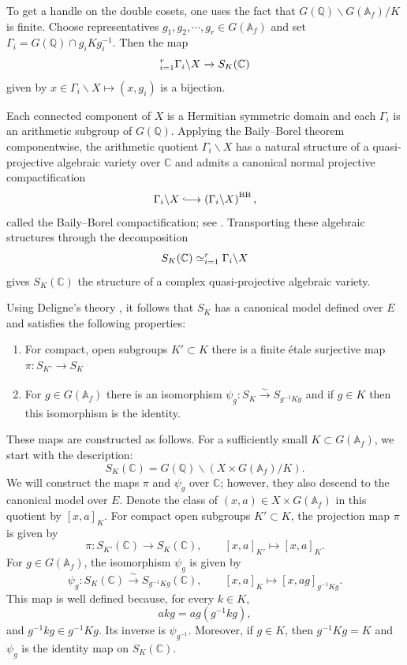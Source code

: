\documentclass[11pt,a4paper]{article}
\let\coprod\relax
\theoremstyle{definition}
\theoremstyle{plain}
\theoremstyle{remark}
\theoremstyle{plain}
\begin{document}
To get a handle on the double cosets, one uses the fact that $G(\mathbb{Q}) \backslash G(\mathbb{A}_f) / K$ is finite. Choose representatives $g_1, g_2, \cdots, g_r \in G(\mathbb{A}_f)$ and set $\Gamma_i = G(\mathbb{Q}) \cap g_i K g_i^{-1}$. Then the map $$ \coprod_{i=1}^r \Gamma_i \backslash X \xrightarrow{} S_K(\mathbb{C})$$ given by $x \in \Gamma_i \backslash X \mapsto (x, g_i)$ is a bijection. 

Each connected component of $X$ is a Hermitian symmetric domain and each $\Gamma_i$ is
an arithmetic subgroup of $G(\mathbb{Q})$. Applying the Baily--Borel theorem componentwise, the
arithmetic quotient $\Gamma_i\backslash X$ has a natural structure of a
quasi-projective algebraic variety over $\mathbb{C}$ and admits a canonical
normal projective compactification
$$
    \Gamma_i\backslash X
    \lhook\joinrel\longrightarrow
    \left(\Gamma_i\backslash X\right)^{\mathrm{BB}},
$$
called the Baily--Borel compactification; see \cite{MR216035}. Transporting
these algebraic structures through the decomposition
$$
    S_K(\mathbb{C})
    \simeq
    \coprod_{i=1}^{r}\Gamma_i\backslash X
$$
gives $S_K(\mathbb{C})$ the structure of a complex quasi-projective algebraic
variety.

Using Deligne's theory \cite{MR546620}, it follows that $S_K$ has a canonical model defined over $E$ and satisfies the following properties:

\begin{enumerate}
    \item For compact, open subgroups $K' \subset K$ there is a finite étale surjective map $\pi: S_{K'} \xrightarrow[]{} S_K$
    \item For $g \in G(\mathbb{A}_f)$ there is an isomorphism $\psi_g: S_K \xrightarrow[]{\sim} S_{g^{-1}Kg}$ and if $g \in K$ then this isomorphism is the identity.
\end{enumerate}

These maps are constructed as follows. For a sufficiently small
$K\subset G(\mathbb{A}_f)$, we start with the description:
$$
S_K(\mathbb{C})
=
G(\mathbb{Q})\backslash
\left(X\times G(\mathbb{A}_f)/K\right).
$$
We will construct the maps $\pi$ and $\psi_g$ over $\mathbb{C}$; however, they also descend to the canonical model over $E$. Denote the class of $(x,a)\in X\times G(\mathbb{A}_f)$ in this
quotient by $[x,a]_K$. For compact open subgroups $K'\subset K$, the projection map $\pi$ is given by
$$
\pi:S_{K'}(\mathbb{C})\longrightarrow S_K(\mathbb{C}),
\qquad
[x,a]_{K'}\longmapsto [x,a]_K.
$$
For $g\in G(\mathbb{A}_f)$, the isomorphism $\psi_g$ is given by
$$
\psi_g:S_K(\mathbb{C})
\xrightarrow[]{\sim}
S_{g^{-1}Kg}(\mathbb{C}),
\qquad
[x,a]_K\longmapsto [x,ag]_{g^{-1}Kg}.
$$
This map is well defined because, for every $k\in K$,
$$
akg=ag(g^{-1}kg),
$$
and $g^{-1}kg\in g^{-1}Kg$. Its inverse is $\psi_{g^{-1}}$. Moreover,
if $g\in K$, then $g^{-1}Kg=K$ and $\psi_g$ is the identity map on
$S_K(\mathbb{C})$.
\end{document}

